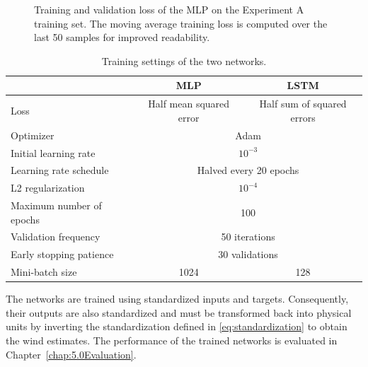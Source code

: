 \begin{figure}[htbp]
%
		\caption{Training and validation loss of the MLP on the Experiment A training set. The moving average training loss is computed over the last 50 samples for improved readability.}
		\label{fig:MLP_ExpA_Loss}
\end{figure}


\begin{table}[htb]
	\centering
	\caption{Training settings of the two networks.}
	\label{tab:training_settings}
	\begin{tabular}{lcc}
		\toprule
		& MLP & LSTM \\
		\midrule
		Loss                        & Half mean squared error & Half sum of squared errors \\
		Optimizer                   & \multicolumn{2}{c}{Adam} \\
		Initial learning rate       & \multicolumn{2}{c}{$10^{-3}$} \\
		Learning rate schedule      & \multicolumn{2}{c}{Halved every 20 epochs} \\
		L2 regularization           & \multicolumn{2}{c}{$10^{-4}$} \\
		Maximum number of epochs    & \multicolumn{2}{c}{100} \\
		Validation frequency        & \multicolumn{2}{c}{50 iterations} \\
		Early stopping patience     & \multicolumn{2}{c}{30 validations} \\
		Mini-batch size             & 1024 & 128 \\
		\bottomrule
	\end{tabular}
\end{table}

The networks are trained using standardized inputs and targets. Consequently, their outputs are also standardized and must be transformed back into physical units by inverting the standardization defined in \eqref{eq:standardization} to obtain the wind estimates. The performance of the trained networks is evaluated in Chapter~\ref{chap:5.0Evaluation}.